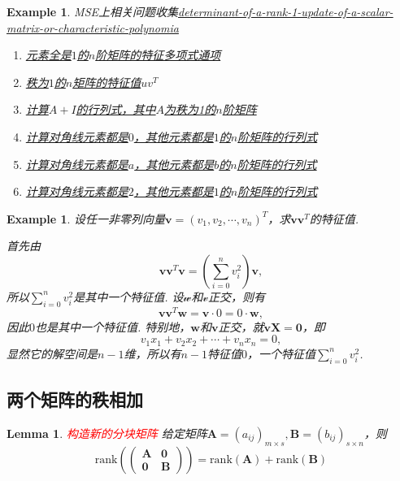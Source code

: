 \documentclass{article}
\newtheorem{lemma}[theorem]{Lemma}
\newtheorem{example}[theorem]{Example}
\newcommand{\mbf}[1]{\bm{#1}}
\newcommand{\rank}[1]{\text{rank}\left(#1\right)} %
\newcommand{\redt}[1]{\textcolor{red}{#1}}
\begin{document}
\begin{example}
\rm MSE上相关问题收集\href{https://math.stackexchange.com/questions/904926/determinant-of-a-rank-1-update-of-a-scalar-matrix-or-characteristic-polynomia}{determinant-of-a-rank-1-update-of-a-scalar-matrix-or-characteristic-polynomia}
\begin{enumerate}
	\item \href{https://math.stackexchange.com/q/153457/18880}{元素全是$1$的$n$阶矩阵的特征多项式通项}
	\item \href{https://math.stackexchange.com/q/55165/18880}{秩为$1$的$n$矩阵的特征值$uv^T$}
	\item \href{https://math.stackexchange.com/q/577937/18880}{计算$A+I$的行列式，其中$A$为秩为1的$n$阶矩阵}
	\item \href{https://math.stackexchange.com/q/84206/18880}{计算对角线元素都是$0$，其他元素都是$1$的$n$阶矩阵的行列式}
	\item \href{https://math.stackexchange.com/q/86644/18880}{计算对角线元素都是$a$，其他元素都是$b$的$n$阶矩阵的行列式}
	\item \href{https://math.stackexchange.com/questions/629892/determinant-of-a-special-n-times-n-matrix}{计算对角线元素都是$2$，其他元素都是$1$的$n$阶矩阵的行列式}
\end{enumerate}
\end{example}

\begin{example}
\rm 设任一非零列向量$\mbf{v}=(v_1,v_2,\cdots,v_n)^T$，求$\mbf{v}\mbf{v}^T$的特征值.

首先由
$$
\mbf{v}\mbf{v}^T\mbf{v} = \left(\sum\limits_{i = 0}^{n}v_i^2 \right)\mbf{v},
$$
所以$\sum\limits_{i = 0}^{n}v_i^2$是其中一个特征值. 设$\mathcal{w}$和$\mathcal{v}$正交，则有
$$
\mbf{v}\mbf{v}^T\mbf{w} = \mbf{v} \cdot 0 = 0 \cdot \mbf{w}, 
$$
因此$0$也是其中一个特征值. 特别地，$\mbf{w}$和$\mbf{v}$正交，就$\mbf{v}\mbf{X} = \mbf{0}$，即
$$
v_1 x_1 + v_2 x_2 + \cdots + v_n x_n = 0, 
$$
显然它的解空间是$n-1$维，所以有$n-1$特征值$0$，一个特征值$\sum\limits_{i = 0}^{n}v_i^2$. 
\end{example}

\subsection{两个矩阵的秩相加}

\begin{lemma}
\rm \redt{构造新的分块矩阵} 给定矩阵$\mbf{A}=(a_{ij})_{m \times s},\mbf{B}=(b_{ij})_{s \times n}$，则
$$
\rank{\begin{pmatrix}
\mbf{A} & \mbf{0} \\
\mbf{0}	& \mbf{B} 
\end{pmatrix}} = \rank{\mbf{A}}+\rank{\mbf{B}}
$$
\end{lemma}
\end{document}
